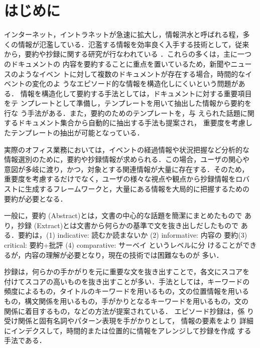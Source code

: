 

\maketitle



\section{はじめに}

インターネット，イントラネットが急速に拡大し，情報洪水と呼ばれる程，多
くの情報が氾濫している．氾濫する情報を効率良く入手する技術として，従来
から，要約や抄録に関する研究が行なわれている
\cite{tamura,hara,yamamoto}．これらの多くは，主に一つのドキュメントの
内容を要約することに重点を置いているため，新聞やニュースのようなイベン
トに対して複数のドキュメントが存在する場合，時間的なイベントの変化のよ
うなエピソード的な情報を構造化しにくいという問題がある\cite{yoshida}．
情報を構造化して要約する手法としては，ドキュメントに対する重要項目をテ
ンプレートとして準備し，テンプレートを用いて抽出した情報から要約を行な
う手法がある\cite{mckeown,ando}．また，要約のためのテンプレートを，与
えられた話題に関するドキュメント集合から自動的に抽出する手法も提案され，
重要度を考慮したテンプレートの抽出が可能となっている\cite{yoshida}．

実際のオフィス業務においては，イベントの経過情報や状況把握など分析的な
情報選別のために，要約や抄録情報が求められる．この場合，ユーザの関心や
意図が多岐に渡り，かつ，対象とする関連情報が大量に存在する．そのため，
重要度を考慮するだけでなく，ユーザの様々な視点や観点から抄録情報をロバ
ストに生成するフレームワークと，大量にある情報を大局的に把握するための
要約が必要となる．

一般に，要約 (Abstract)とは，文書の中心的な話題を簡潔にまとめたもので
あり，抄録 (Extract)とは文書から何らかの基準で文を抜き出しだしたもので
ある．要約は，(1) indicative: 読むか読まないか (2) informative: 内容の
要約(3) critical: 要約+批評 (4) comparative: サーベイ というレベルに分
けることができるが，内容の理解が必要となり，現在の技術では困難なものが
多い\cite{paice}．

抄録は，何らかの手かがりを元に重要な文を抜き出すことで，各文にスコアを
付けてスコアの高いものを抜き出すことが多い．手法としては，キーワードの
頻度によるもの，タイトルのキーワードを用いるもの，文の位置情報を用いる
もの，構文関係を用いるもの，手がかりとなるキーワードを用いるもの，文の
関係に着目するもの，などの方法が提案されている． エピソード抄録は，係
り受け関係と固有名詞やパターン表現を手がかりとして， 情報の要素をより
詳細にインデクスして，時間的または位置的に情報をアレンジして抄録を作成
する手法である．

